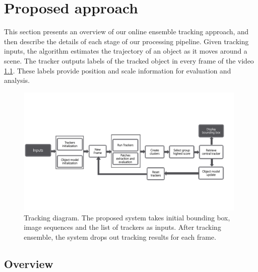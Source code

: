 \chapter{Proposed approach} %

\label{chapter::approach} %


This section presents an overview of our online ensemble
tracking approach, and then describe the details of each stage of our
processing pipeline. Given tracking inputs, the algorithm estimates the
trajectory of an object as it moves around a scene. The tracker outputs labels
of the tracked object in every frame of the video \ref{fig::global_diagram}.
These labels provide position and scale information for evaluation and analysis.

\begin{figure}[h!]
\centering
\includegraphics[page=2, width=0.8\linewidth, trim= 0cm 5.1cm 6cm 5.3cm,
                 clip=true]{Figures/global_diagram}
\caption[Tracking diagram]{\small Tracking diagram. The proposed system takes
        initial bounding box, image sequences and the list of trackers as inputs.
        After tracking ensemble, the system drops out tracking results for each
        frame.}
\label{fig::global_diagram}
\end{figure}


\section{Overview}

